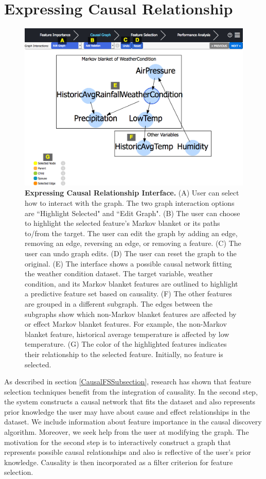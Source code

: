 \section{Expressing Causal Relationship}
\begin{figure}[!htbp]
\centering
\includegraphics[width=1\textwidth]{LabeledCGInterface}
\caption{\textbf{Expressing Causal Relationship Interface.}  (A) User can select how to interact with the graph. The two graph interaction options are ``Highlight Selected" and ``Edit Graph". (B) The user can choose to highlight the selected feature's Markov blanket or its paths to/from the target. The user can edit the graph by adding an edge, removing an edge, reversing an edge, or removing a feature. (C) The user can undo graph edits. (D) The user can reset the graph to the original. (E) The interface shows a possible causal network fitting the weather condition dataset. The target variable, weather condition, and its Markov blanket features are outlined to highlight a predictive feature set based on causality. (F) The other features are grouped in a different subgraph. The edges between the subgraphs show which non-Markov blanket features are affected by or effect Markov blanket features. For example, the non-Markov blanket feature, historical average temperature is affected by low temperature. (G) The color of the highlighted features indicates their relationship to the selected feature. Initially, no feature is selected.} \label{fig:LabelCGInterface}
\end{figure}

As described in section \ref{CausalFSSubsection}, research has shown that feature selection techniques benefit from the integration of causality. In the second step, the system constructs a causal network that fits the dataset and also represents prior knowledge the user may have about cause and effect relationships in the dataset. We include information about feature importance in the causal discovery algorithm. Moreover, we seek help from the user at modifying the graph. The motivation for the second step is to interactively construct a graph that represents possible causal relationships and also is reflective of the user's prior knowledge. Causality is then incorporated as a filter criterion for feature selection.

